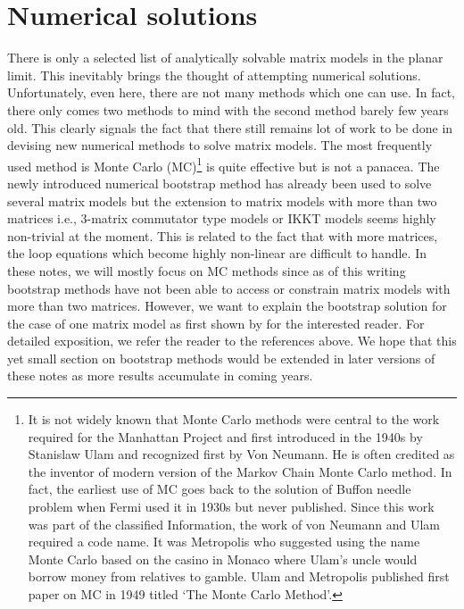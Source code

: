 \documentclass[11pt]{article}
\begin{document}
\section{\label{sec:NSOL}Numerical solutions} 
There is only a selected list of analytically solvable matrix models in the planar limit. This inevitably brings 
the thought of attempting numerical solutions. Unfortunately, even here, there are not many methods 
which one can use. In fact, there only comes two methods to mind with the second method barely few years old. 
This clearly signals the fact that there still remains lot of work to be done in devising new numerical 
methods to solve matrix models. The most frequently used method is Monte Carlo (MC)\footnote{
It is not widely known that Monte Carlo methods were central to the work required for the Manhattan Project
and first introduced in the 1940s by Stanislaw Ulam and recognized first by Von Neumann. 
He is often credited as the inventor of modern version of the Markov Chain Monte Carlo 
method. In fact, the earliest use of MC goes back to the solution of Buffon needle problem when Fermi used it in 1930s but never published. 
Since this work was part of the classified Information, the work of von Neumann and Ulam required a code name. It was Metropolis who 
suggested using the name Monte Carlo based on the casino in 
Monaco where Ulam's uncle would borrow money from relatives to gamble. Ulam and Metropolis
published first paper on MC in 1949 titled `The Monte Carlo Method'.} 
is quite effective but is not a panacea. 
The newly introduced numerical bootstrap method has already been used to solve several matrix models \cite{Anderson:2016rcw,Lin:2020mme,Han:2020bkb,Kazakov:2021lel} but the extension to matrix models with more than two matrices i.e., 3-matrix commutator type models or IKKT models seems highly non-trivial at the moment. 
This is related to the fact that with more matrices, the loop equations which become highly non-linear are difficult to handle.
In these notes, we will mostly focus on MC methods since as of this writing bootstrap methods have not been able to access or constrain matrix models with more than two matrices. However, we want to explain the bootstrap solution for the case of one matrix model as first shown by \cite{Lin:2020mme} for the interested reader. For detailed exposition, we refer the reader to the references above. We hope that this 
yet small section on bootstrap methods would be extended in later versions 
of these notes as more results accumulate in coming years. 
\end{document}
